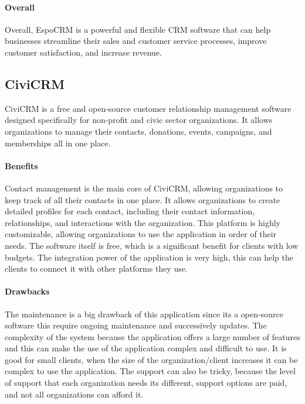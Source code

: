\documentclass{article}
\begin{document}
\paragraph{Overall}


Overall, EspoCRM is a powerful and flexible CRM software that can help businesses streamline their sales and customer service processes, improve customer satisfaction, and increase revenue.

\subsection{CiviCRM}

 CiviCRM is a free and open-source customer relationship management software designed specifically for non-profit and civic sector organizations. It allows organizations to manage their contacts, donations, events, campaigns, and memberships all in one place. 

\paragraph{Benefits}

Contact management is the main core of CiviCRM, allowing organizations to keep track of all their contacts in one place. It allows organizations to create detailed profiles for each contact, including their contact information, relationships, and interactions with the organization. This platform is highly customizable, allowing organizations to use the application in order of their needs. The software itself is free, which is a significant benefit for clients with low budgets. The integration power of the application is very high, this can help the clients to connect it with other platforms they use.

\paragraph{Drawbacks}

The maintenance is a big drawback of this application since its a open-source software this require ongoing maintenance and successively updates. The complexity of the system because the application offers a large number of features and this can make the use of the application complex and difficult to use. It is good for small clients, when the size of the organization/client increases it can be complex to use the application. The support can also be tricky, because the level of support that each organization needs its different, support options are paid, and not all organizations can afford it.
\end{document}

